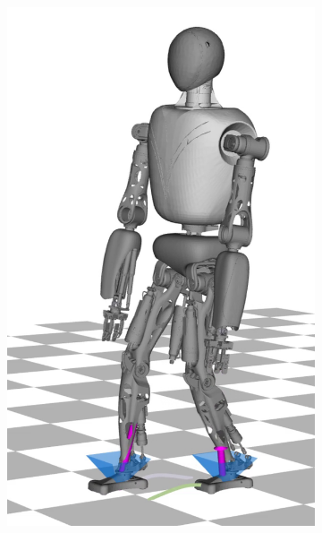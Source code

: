 \begin{figure}
\begin{subfigure}{.16\textwidth}
	\includegraphics[width=1\linewidth]{fig/walkDynamic/snaps/4}
	\caption{}
\end{subfigure}%
\begin{subfigure}{.16\textwidth}

\end{subfigure}
\end{figure}
